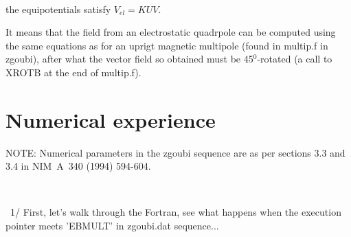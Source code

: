 \documentclass[10pt]{article}
\newcommand{\nin}{\noindent~}
\begin{document}
\begin{minipage}{1.\linewidth}
\begin{minipage}{0.54\linewidth}
~

 the equipotentials satisfy $V_{el} = K UV$.

\medskip

 
 It means that the field from an electrostatic quadrpole can be computed using the same equations as for an uprigt magnetic multipole
 (found in multip.f in zgoubi), after what the vector field so obtained must be 45$^0$-rotated (a call to XROTB at the end of
 multip.f). 
 

\end{minipage}
\end{minipage}






\clearpage

\section*{ Numerical experience }

NOTE: Numerical parameters in the zgoubi sequence are as per sections 3.3 and 3.4 in NIM~A~340 (1994) 594-604.

~


\nin 1/ First, let's  walk through the Fortran, see what happens when the execution pointer meets 'EBMULT' in zgoubi.dat sequence...
\end{document}
